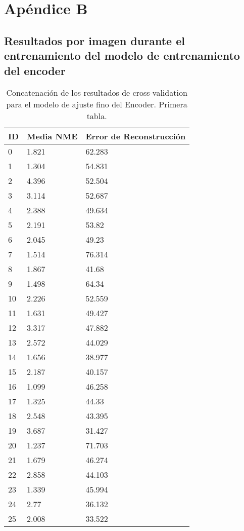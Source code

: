 
\chapter{Apéndice B}\label{ap:apendiceB}

\section{Resultados por imagen durante el entrenamiento del modelo de entrenamiento del encoder}

\begin{table}[!ht]
    \centering
    \caption{Concatenación de los resultados de cross-validation para el modelo de ajuste fino del Encoder. Primera tabla.}
    \begin{tabular}{|l|l|l|}
    \hline
    \cellcolor{gray!25}\textbf{ID} & \cellcolor{gray!25}\textbf{Media NME} & \cellcolor{gray!25}\textbf{Error de Reconstrucción} \\ \hline
        0 & 1.821 & 62.283 \\ \hline
        1 & 1.304 & 54.831 \\ \hline
        2 & 4.396 & 52.504 \\ \hline
        3 & 3.114 & 52.687 \\ \hline
        4 & 2.388 & 49.634 \\ \hline
        5 & 2.191 & 53.82 \\ \hline
        6 & 2.045 & 49.23 \\ \hline
        7 & 1.514 & 76.314 \\ \hline
        8 & 1.867 & 41.68 \\ \hline
        9 & 1.498 & 64.34 \\ \hline
        10 & 2.226 & 52.559 \\ \hline
        11 & 1.631 & 49.427 \\ \hline
        12 & 3.317 & 47.882 \\ \hline
        13 & 2.572 & 44.029 \\ \hline
        14 & 1.656 & 38.977 \\ \hline
        15 & 2.187 & 40.157 \\ \hline
        16 & 1.099 & 46.258 \\ \hline
        17 & 1.325 & 44.33 \\ \hline
        18 & 2.548 & 43.395 \\ \hline
        19 & 3.687 & 31.427 \\ \hline
        20 & 1.237 & 71.703 \\ \hline
        21 & 1.679 & 46.274 \\ \hline
        22 & 2.858 & 44.103 \\ \hline
        23 & 1.339 & 45.994 \\ \hline
        24 & 2.77 & 36.132 \\ \hline
        25 & 2.008 & 33.522 \\ \hline
    \end{tabular}
\end{table}

